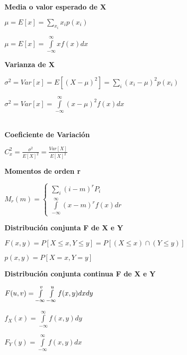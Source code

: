 \begin{minipage}{0.22\textwidth}
	{\bf Media o valor esperado de X}
	\begin{center} $\mu = E[x] = \sum\limits_{x_i} {x_i}{p(x_i)}$\end{center}
	\begin{center} $\mu = E[x] = \int\limits_{-\infty}^{\infty} xf(x)dx$\end{center}
	{\bf Varianza de X}
	\begin{center} $\sigma^2 = Var[x] = E[({X-\mu})^2] = \sum\limits_{i} ({x_i}-{\mu})^2{p(x_i)}$\end{center}
	\begin{center} $\sigma^2 = Var[x] = \int\limits_{-\infty}^{\infty} (x-\mu)^2f(x)dx$\end{center}
	 \\
	{\bf Coeficiente de Variación}
	\begin{center} $C_x^2 = \frac {\sigma^2}{E[X]^2} = \frac{Var[X]}{E[X]^2}$\end{center}
	{\bf Momentos de orden r}
	\begin{center} $M_r(m) = \left \{  \begin{matrix} \sum\limits_{i} ({i}-{m})^r{P_i} \\
				\int\limits_{-\infty}^{\infty} (x-m)^rf(x)dr\end{matrix}  \right .$\end{center}
\end{minipage}
\vfill\null
\columnbreak
\begin{minipage}{0.22\textwidth}
	{\bf Distribución conjunta F de X e Y}
	\begin{center} $F(x,y) = P[X \le x, Y \le y] = P[(X \le x) \cap  (Y \le y)]$\end{center}
	\begin{center} $p(x,y) = P[X = x, Y = y]$\end{center}
	{\bf Distribución conjunta continua F de X e Y}
	\begin{center} $F(u,v) = \int\limits_{-\infty}^v \int\limits\limits_{-\infty}^u f(x,y)dxdy$\end{center}
	\begin{center} $f_X(x) = \int\limits_{-\infty}^{\infty} f(x,y)dy$\end{center}
	\begin{center} $F_Y(y) = \int\limits_{-\infty}^{\infty} f(x,y)dx$\end{center}
\end{minipage}